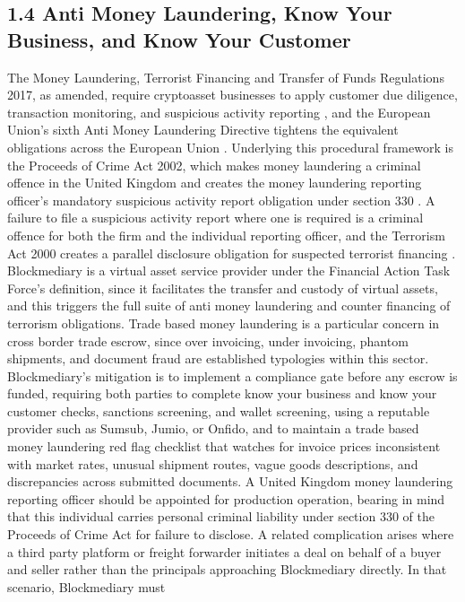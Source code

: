 \documentclass[12pt, a4paper]{article}
\begin{document}
\subsection*{1.4 Anti Money Laundering, Know Your Business, and Know Your Customer}

The Money Laundering, Terrorist Financing and Transfer of Funds Regulations 2017, as
amended, require cryptoasset businesses to apply customer due diligence, transaction
monitoring, and suspicious activity reporting \citep{mlr2017}, and the European Union's
sixth Anti Money Laundering Directive tightens the equivalent obligations across the
European Union \citep{amld6}. Underlying this procedural framework is the Proceeds of
Crime Act 2002, which makes money laundering a criminal offence in the United Kingdom and
creates the money laundering reporting officer's mandatory suspicious activity report
obligation under section 330 \citep{poca2002}. A failure to file a suspicious activity
report where one is required is a criminal offence for both the firm and the individual
reporting officer, and the Terrorism Act 2000 creates a parallel disclosure obligation for
suspected terrorist financing \citep{terrorismact2000}. Blockmediary is a virtual asset
service provider under the Financial Action Task Force's definition, since it facilitates
the transfer and custody of virtual assets, and this triggers the full suite of anti money
laundering and counter financing of terrorism obligations. Trade based money laundering is
a particular concern in cross border trade escrow, since over invoicing, under invoicing,
phantom shipments, and document fraud are established typologies within this sector.
Blockmediary's mitigation is to implement a compliance gate before any escrow is funded,
requiring both parties to complete know your business and know your customer checks,
sanctions screening, and wallet screening, using a reputable provider such as Sumsub,
Jumio, or Onfido, and to maintain a trade based money laundering red flag checklist that
watches for invoice prices inconsistent with market rates, unusual shipment routes, vague
goods descriptions, and discrepancies across submitted documents. A United Kingdom money
laundering reporting officer should be appointed for production operation, bearing in mind
that this individual carries personal criminal liability under section 330 of the Proceeds
of Crime Act for failure to disclose. A related complication arises where a third party
platform or freight forwarder initiates a deal on behalf of a buyer and seller rather than
the principals approaching Blockmediary directly. In that scenario, Blockmediary must
\end{document}
